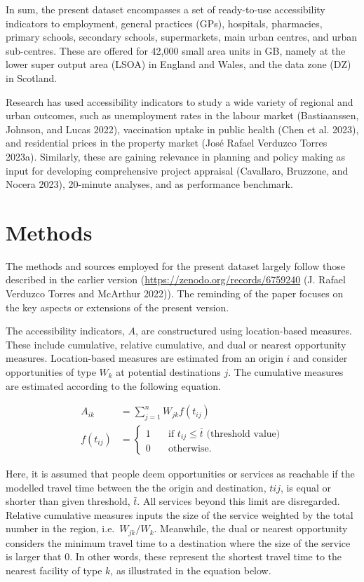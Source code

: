 \documentclass{article}
\begin{document}
In sum, the present dataset encompasses a set of ready-to-use
accessibility indicators to employment, general practices (GPs),
hospitals, pharmacies, primary schools, secondary schools, supermarkets,
main urban centres, and urban sub-centres. These are offered for 42,000
small area units in GB, namely at the lower super output area (LSOA) in
England and Wales, and the data zone (DZ) in Scotland.

Research has used accessibility indicators to study a wide variety of
regional and urban outcomes, such as unemployment rates in the labour
market (Bastiaanssen, Johnson, and Lucas 2022), vaccination uptake in
public health (Chen et al. 2023), and residential prices in the property
market (José Rafael Verduzco Torres 2023a). Similarly, these are gaining
relevance in planning and policy making as input for developing
comprehensive project appraisal (Cavallaro, Bruzzone, and Nocera 2023),
20-minute analyses, and as performance benchmark.

\hypertarget{methods}{%
\section{Methods}\label{methods}}

The methods and sources employed for the present dataset largely follow
those described in the earlier version
(\url{https://zenodo.org/records/6759240} (J. Rafael Verduzco Torres and
McArthur 2022)). The reminding of the paper focuses on the key aspects
or extensions of the present version.

The accessibility indicators, \(A\), are constructured using
location-based measures. These include cumulative, relative cumulative,
and dual or nearest opportunity measures. Location-based measures are
estimated from an origin \(i\) and consider opportunities of type
\(W_k\) at potential destinations \(j\). The cumulative measures are
estimated according to the following equation.

\[
\begin{aligned}
A_{ik} &= \sum_{j=1}^{n} W_{jk} f(t_{ij}) \\
f(t_{ij}) &= \left\{
      \begin{array}{ll}
          1 & \quad \text{if }t_{ij} \leq \bar{t} \text{ (threshold value)} \\
          0 & \quad \text{otherwise}.
      \end{array}
    \right.
\end{aligned}
\]

Here, it is assumed that people deem opportunities or services as
reachable if the modelled travel time between the the origin and
destination, \(t{ij}\), is equal or shorter than given threshold,
\(\bar{t}\). All services beyond this limit are disregarded. Relative
cumulative measures inputs the size of the service weighted by the total
number in the region, i.e.~\(W_{jk} / W_k\). Meanwhile, the dual or
nearest opportunity considers the minimum travel time to a destination
where the size of the service is larger that 0. In other words, these
represent the shortest travel time to the nearest facility of type
\(k\), as illustrated in the equation below.
\end{document}
